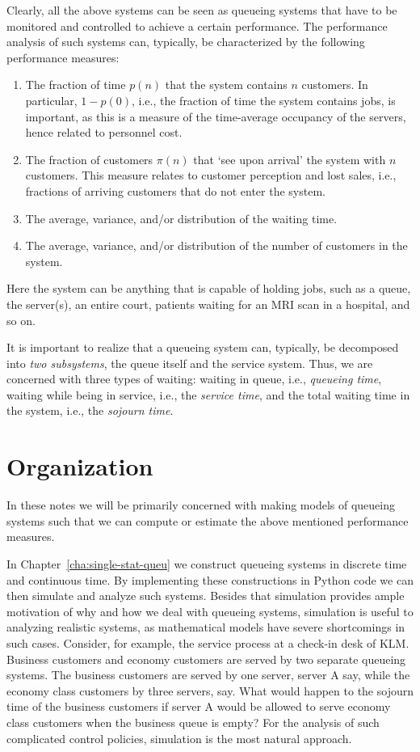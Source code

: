 Clearly, all the above systems can be seen as queueing systems that
have to be monitored and controlled to achieve a certain
performance. The performance analysis of such systems can, typically,
be characterized by the following performance measures:
\begin{enumerate}
\item The fraction of time $p(n)$ that the system contains $n$
  customers. In particular, $1-p(0)$, i.e., the fraction of time the
  system contains jobs, is important, as this is a measure of the
  time-average occupancy of the servers, hence related to personnel
  cost.
\item The fraction of customers $\pi(n)$ that `see upon arrival' the
  system with $n$ customers. This measure relates to customer
  perception and lost sales, i.e., fractions of arriving customers
  that do not enter the system.
\item The average, variance, and/or distribution of the waiting time.
\item The average, variance, and/or distribution of the number of customers in the system.\
\end{enumerate}
Here the system can be anything that is capable of holding jobs, such
as a queue, the server(s), an entire court, patients waiting for
an MRI scan in a hospital, and so on.

It is important to realize that a queueing system can, typically, be
decomposed into \emph{two subsystems}, the queue itself and the
service system. Thus, we are concerned with three types of waiting:
waiting in queue, i.e., \emph{queueing time}, waiting while being in
service, i.e., the \emph{service time}, and the total waiting time in
the system, i.e., the \emph{sojourn time}.

\section{Organization}


In these notes we will be primarily concerned with making models of queueing systems such that we can compute or estimate the above mentioned performance measures.

In Chapter~\ref{cha:single-stat-queu} we construct queueing systems in discrete time and continuous time.
By implementing these constructions in Python code we can then simulate and analyze such systems.
Besides that simulation provides ample motivation of why and how we deal with queueing systems, simulation is useful to analyzing realistic systems, as mathematical models have severe shortcomings in such cases.
Consider, for example, the service process at a check-in desk of KLM.
Business customers and economy customers are served by two separate queueing systems.
The business customers are served by one server, server A say, while the economy class customers by three servers, say.
What would happen to the sojourn time of the business customers if server A would be allowed to serve economy class customers when the business queue is empty?
For the analysis of such complicated control policies, simulation is the most natural approach.

